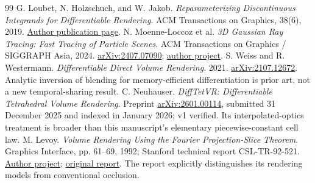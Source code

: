 \documentclass[10pt,letterpaper]{article}
\theoremstyle{remark}\newtheorem{counterexample}[proposition]{Counterexample}
\begin{document}
\begin{thebibliography}{99}
 G. Loubet, N. Holzschuch, and W. Jakob. \emph{Reparameterizing Discontinuous Integrands for Differentiable Rendering}. ACM Transactions on Graphics, 38(6), 2019. \href{https://rgl.epfl.ch/publications/Loubet2019Reparameterizing}{Author publication page}.
 N. Moenne-Loccoz et al. \emph{3D Gaussian Ray Tracing: Fast Tracing of Particle Scenes}. ACM Transactions on Graphics / SIGGRAPH Asia, 2024. \href{https://arxiv.org/abs/2407.07090}{arXiv:2407.07090}; \href{https://gaussiantracer.github.io/}{author project}.
 S. Weiss and R. Westermann. \emph{Differentiable Direct Volume Rendering}. 2021. \href{https://arxiv.org/abs/2107.12672}{arXiv:2107.12672}. Analytic inversion of blending for memory-efficient differentiation is prior art, not a new temporal-sharing result.
 C. Neuhauser. \emph{DiffTetVR: Differentiable Tetrahedral Volume Rendering}. Preprint \href{https://arxiv.org/abs/2601.00114}{arXiv:2601.00114}, submitted 31 December 2025 and indexed in January 2026; v1 verified. Its interpolated-optics treatment is broader than this manuscript's elementary piecewise-constant cell law.
 M. Levoy. \emph{Volume Rendering Using the Fourier Projection-Slice Theorem}. Graphics Interface, pp. 61--69, 1992; Stanford technical report CSL-TR-92-521. \href{https://graphics.stanford.edu/papers/fourier/}{Author project}; \href{https://graphics.stanford.edu/papers/fourier/Levoy_GI92_VolumeRendering.pdf}{original report}. The report explicitly distinguishes its rendering models from conventional occlusion.
\end{thebibliography}
\end{document}
